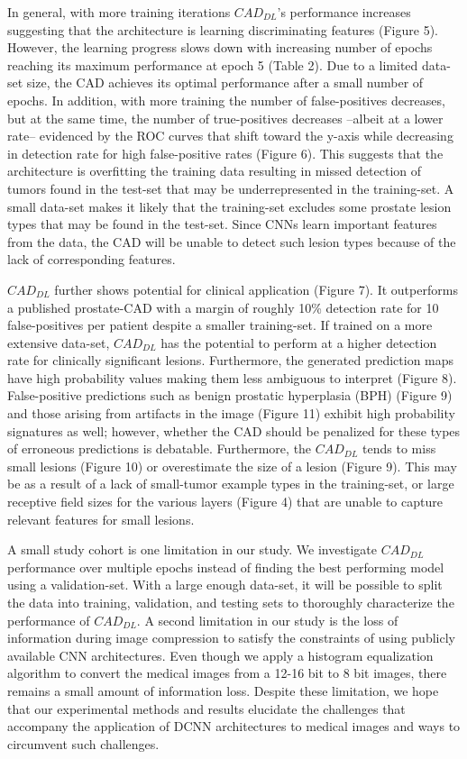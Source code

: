 In general, with more training iterations $CAD_{DL}$'s performance increases suggesting that the architecture is learning discriminating features (Figure 5). However, the learning progress slows down with increasing number of epochs reaching its maximum performance at epoch 5 (Table 2). Due to a limited data-set size, the CAD achieves its optimal performance after a small number of epochs. In addition, with more training the number of false-positives decreases, but at the same time, the number of true-positives decreases --albeit at a lower rate-- evidenced by the ROC curves that shift toward the y-axis while decreasing in detection rate for high false-positive rates (Figure 6). This suggests that the architecture is overfitting the training data resulting in missed detection of tumors found in the test-set that may be underrepresented in the training-set. A small data-set makes it likely that the training-set excludes some prostate lesion types that may be found in the test-set. Since CNNs learn important features from the data, the CAD will be unable to detect such lesion types because of the lack of corresponding features.

$CAD_{DL}$ further shows potential for clinical application (Figure 7). It outperforms a published prostate-CAD with a margin of roughly 10\% detection rate for 10 false-positives per patient despite a smaller training-set. If trained on a more extensive data-set, $CAD_{DL}$ has the potential to perform at a higher detection rate for clinically significant lesions. Furthermore, the generated prediction maps have high probability values making them less ambiguous to interpret (Figure 8). False-positive predictions such as benign prostatic hyperplasia (BPH) (Figure 9) and those arising from artifacts in the image (Figure 11) exhibit high probability signatures as well; however, whether the CAD should be penalized for these types of erroneous predictions is debatable. Furthermore, the $CAD_{DL}$ tends to miss small lesions (Figure 10) or overestimate the size of a lesion (Figure 9). This may be as a result of a lack of small-tumor example types in the training-set, or large receptive field sizes for the various layers (Figure 4) that are unable to capture relevant features for small lesions.

A small study cohort is one limitation in our study. We investigate $CAD_{DL}$ performance over multiple epochs instead of finding the best performing model using a validation-set. With a large enough data-set, it will be possible to split the data into training, validation, and testing sets to thoroughly characterize the performance of $CAD_{DL}$. A second limitation in our study is the loss of information during image compression to satisfy the constraints of using publicly available CNN architectures. Even though we apply a histogram equalization algorithm to convert the medical images from a 12-16 bit to 8 bit images, there remains a small amount of information loss. Despite these limitation, we hope that our experimental methods and results elucidate the challenges that accompany the application of DCNN architectures to medical images and ways to circumvent such challenges. 

